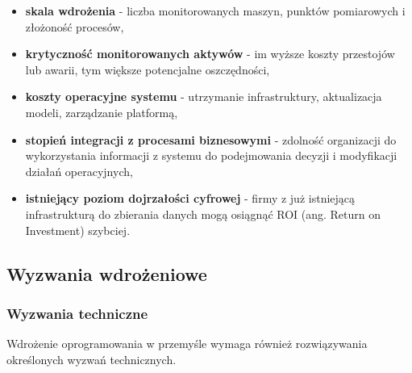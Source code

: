 \begin{itemize}
    \item \textbf{skala wdrożenia} - liczba monitorowanych maszyn, punktów pomiarowych i złożoność procesów,
    \item \textbf{krytyczność monitorowanych aktywów} - im wyższe koszty przestojów lub awarii, tym większe potencjalne oszczędności,
    \item \textbf{koszty operacyjne systemu} - utrzymanie infrastruktury, aktualizacja modeli, zarządzanie platformą,
    \item \textbf{stopień integracji z procesami biznesowymi} - zdolność organizacji do wykorzystania informacji z systemu do podejmowania decyzji i modyfikacji działań operacyjnych,
    \item \textbf{istniejący poziom dojrzałości cyfrowej} - firmy z już istniejącą infrastrukturą do zbierania danych mogą osiągnąć ROI (ang. Return on Investment) szybciej.
\end{itemize}

\newpage

\subsection{Wyzwania wdrożeniowe}
\label{subsec:wyzwania_wdrozeniowe}

\subsubsection{Wyzwania techniczne}
\label{subsubsec:wyzwania_techniczne}

Wdrożenie oprogramowania w przemyśle wymaga również rozwiązywania określonych wyzwań technicznych.


